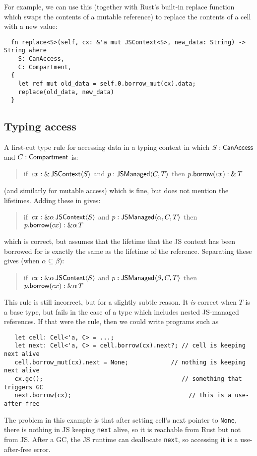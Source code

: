 For example, we can use this (together with Rust's built-in replace function
which swaps the contents of a mutable reference) to replace the contents of a cell
with a new value:
\begin{verbatim}
  fn replace<S>(self, cx: &'a mut JSContext<S>, new_data: String) -> String where
    S: CanAccess,
    C: Compartment,
  {
    let ref mut old_data = self.0.borrow_mut(cx).data;
    replace(old_data, new_data)
  }
\end{verbatim}

\subsection{Typing access}

A first-cut type rule for accessing data in a typing context
in which $S: \mathsf{CanAccess}$ and $C: \mathsf{Compartment}$ is:
\begin{quote}
  if~$cx: \&\, \mathsf{JSContext}\langle S\rangle$ and $p: \mathsf{JSManaged}\langle C,T\rangle$
  then $p.\mathsf{borrow}(cx): \&\, T$
\end{quote}
(and similarly for mutable access)
which is fine, but does not mention the lifetimes. Adding these in gives:
\begin{quote}
  if~$cx: \&\alpha\, \mathsf{JSContext}\langle S\rangle$ and $p: \mathsf{JSManaged}\langle \alpha,C,T\rangle$
  then $p.\mathsf{borrow}(cx): \&\alpha\, T$
\end{quote}
which is correct, but assumes that the lifetime that the JS context
has been borrowed for is exactly the same as the lifetime of the
reference. Separating these gives (when $\alpha \subseteq \beta$):
\begin{quote}
  if~$cx: \&\alpha\, \mathsf{JSContext}\langle S\rangle$ and $p: \mathsf{JSManaged}\langle \beta,C,T\rangle$
  then $p.\mathsf{borrow}(cx): \&\alpha\, T$
\end{quote}
This rule is still incorrect, but for a slightly subtle reason.
It \emph{is} correct when $T$ is a base type, but fails in the case of
a type which includes nested JS-managed references. If that were the
rule, then we could write programs such as
\begin{verbatim}
   let cell: Cell<'a, C> = ...;
   let next: Cell<'a, C> = cell.borrow(cx).next?; // cell is keeping next alive
   cell.borrow_mut(cx).next = None;            // nothing is keeping next alive
   cx.gc();                                       // something that triggers GC
   next.borrow(cx);                                 // this is a use-after-free
\end{verbatim}
The problem in this example is that after setting cell's next pointer to \verb|None|,
there is nothing in JS keeping \verb|next| alive, so it is reachable
from Rust but not from JS. After a GC, the JS runtime can deallocate
\verb|next|, so accessing it is a use-after-free error.

